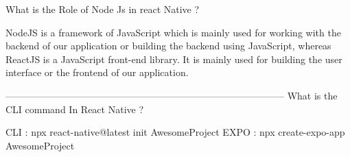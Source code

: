  What is the Role of Node Js in react Native ?

 NodeJS is a framework of JavaScript which is mainly used for 
 working with the backend of our application or building the 
 backend using JavaScript, whereas ReactJS is a JavaScript front-end library. 
 It is mainly used for building the user interface or the frontend of our application.

---------------------------------------------------------------------------------------
 What is the CLI command In React Native ?

 CLI : npx react-native@latest init AwesomeProject
 EXPO : npx create-expo-app AwesomeProject